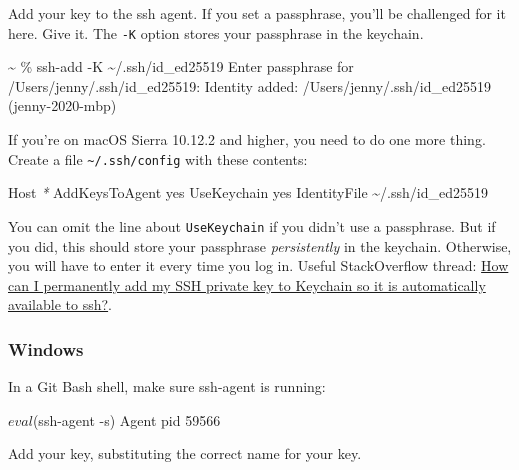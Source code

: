 \documentclass[
]{book}
\newenvironment{Shaded}{\begin{snugshade}}{\end{snugshade}}
\newcommand{\ExtensionTok}[1]{#1}
\newcommand{\NormalTok}[1]{#1}
\newcommand{\PreprocessorTok}[1]{\textcolor[rgb]{0.56,0.35,0.01}{\textit{#1}}}
\begin{document}
Add your key to the ssh agent.
If you set a passphrase, you'll be challenged for it here.
Give it.
The \texttt{-K} option stores your passphrase in the keychain.

\begin{Shaded}
\begin{Highlighting}[]
\NormalTok{\textasciitilde{} \% ssh{-}add {-}K \textasciitilde{}/.ssh/id\_ed25519}
\NormalTok{Enter passphrase for /Users/jenny/.ssh/id\_ed25519: }
\NormalTok{Identity added: /Users/jenny/.ssh/id\_ed25519 (jenny{-}2020{-}mbp)}
\end{Highlighting}
\end{Shaded}

If you're on macOS Sierra 10.12.2 and higher, you need to do one more thing.
Create a file \texttt{\textasciitilde{}/.ssh/config} with these contents:

\begin{Shaded}
\begin{Highlighting}[]
\ExtensionTok{Host} \PreprocessorTok{*}
  \ExtensionTok{AddKeysToAgent}\NormalTok{ yes}
  \ExtensionTok{UseKeychain}\NormalTok{ yes}
  \ExtensionTok{IdentityFile}\NormalTok{ \textasciitilde{}/.ssh/id\_ed25519}
\end{Highlighting}
\end{Shaded}

You can omit the line about \texttt{UseKeychain} if you didn't use a passphrase.
But if you did, this should store your passphrase \emph{persistently} in the keychain.
Otherwise, you will have to enter it every time you log in.
Useful StackOverflow thread: \href{https://apple.stackexchange.com/questions/48502/how-can-i-permanently-add-my-ssh-private-key-to-keychain-so-it-is-automatically}{How can I permanently add my SSH private key to Keychain so it is automatically available to ssh?}.

\subsubsection{Windows}\label{windows}

In a Git Bash shell, make sure ssh-agent is running:

\begin{Shaded}
\begin{Highlighting}[]
\NormalTok{$ eval $(ssh{-}agent {-}s)}
\NormalTok{Agent pid 59566}
\end{Highlighting}
\end{Shaded}

Add your key, substituting the correct name for your key.
\end{document}
